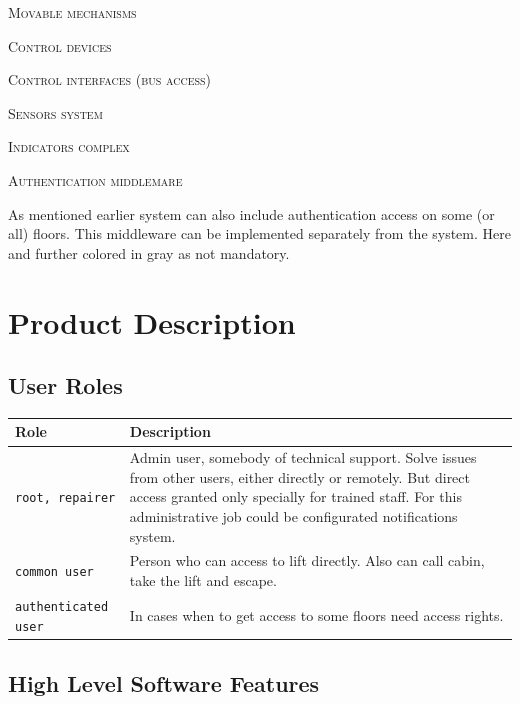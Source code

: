 \documentclass[a4paper,11pt]{article}
\begin{document}
\begin{description}
\begin{itemize}
    \item \textsc{Movable mechanisms}
    \item \textsc{Control devices}
    \item \textsc{Control interfaces (bus access)}
    \item \textsc{Sensors system}
    \item \textsc{Indicators complex}
    {\color{SlateGray}\item \textsc{Authentication middlemare}}
  \end{itemize}
  {\color{SlateGray}
  As mentioned earlier system can also include authentication access on some (or all) floors. This middleware can be implemented separately from the system. Here and further colored in gray as not mandatory.}

\end{description}

\section{Product Description}
\label{sec:Product Description}

\subsection{User Roles}
\label{sub:User Roles}


\noindent\begin{tabularx}{\textwidth}{|C{3cm}|Y|}
  \hline
  Role & Description\\
  \hline
  \texttt{root, repairer} & Admin user, somebody of technical support. Solve issues from other users, either directly or remotely. But direct access granted only specially for trained staff. For this administrative job could be configurated notifications system.\\[10pt]
  \texttt{common user} & Person who can access to lift directly. Also can call cabin, take the lift and escape.\\[10pt]
  \texttt{\color{SlateGray}authenticated user} & \textmd{\color{SlateGray}In cases when to get access to some floors need access rights.} \\

  \hline
\end{tabularx}

\subsection{High Level Software Features}
\label{sub:High Level Software Features}
\end{document}
